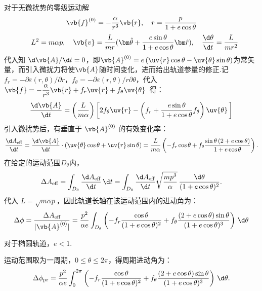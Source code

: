 对于无微扰势的零级运动解
\begin{equation*}
	\vb{f}^{(0)} = -\dfrac{\alpha}{r^3} \vb{r},\quad r=\frac{p}{1+e\cos\theta}
\end{equation*}
\begin{equation*}
	\quad L^2=m\alpha p,\quad \vb{v}=\frac{L}{mr}(\bm\hat{\theta}+\frac{e\sin\theta}{1+e\cos\theta}\bm\hat{r}),\quad \frac{\d \theta}{\d t}=\frac{L}{mr^2}
\end{equation*}
代入知 \(\d \vb{A}/\d t=0\)，即\(\vb{A}^{(0)} = e\, (\uv{r} \cos\theta - \uv{\theta} \sin\theta)\)为常矢量，而引入微扰力将使\(\vb{A}\)随时间变化，进而给出轨道参量的修正.记 \(f_r = -\partial\varepsilon(r,\theta)/\partial r\)，\(f_{\theta} = -\partial\varepsilon(r,\theta)/r\partial\theta\)，代入 \(\vb{f} = -\dfrac{\alpha}{r^3} \vb{r} + f_r \uv{r} + f_{\theta} \uv{\theta}\,\) 得：
\begin{equation*}
	\dfrac{\d \vb{A}}{\d t} = \left( \dfrac{L}{m \alpha} \right) \left[ 2 f_{\theta} \uv{r} - \left( f_r + \dfrac{e \sin\theta}{1 + e \cos\theta} f_{\theta} \right) \uv{\theta} \,\right]
\end{equation*}
引入微扰势后，有垂直于 \(\vb{A}^{(0)}\) 的有效变化率：
\begin{equation*}
	\dfrac{\d A_{\text{eff}}}{\d t} = \dfrac{\d \vb{A}}{\d t} \cdot (\uv{\theta} \cos\theta + \uv{r} \sin\theta) = \dfrac{L}{m \alpha} \left( -f_r \cos\theta + f_{\theta} \dfrac{\sin\theta\, (2 + e \cos\theta)}{1 + e \cos\theta} \right).
\end{equation*}
在给定的运动范围\(D_{\theta}\)内，
\begin{equation*}
	\Delta A_{\text{eff}} = \int_{D_{\theta}} \dfrac{\d A_{\text{eff}}}{\d t} \, \d t = \int_{D_{\theta}} \dfrac{\d A_{\text{eff}}}{\d t} \sqrt{\dfrac{m p^3}{\alpha}} \, \dfrac{\d \theta}{(1 + e \cos\theta)^2}.
\end{equation*}
代入 \(L = \sqrt{m\alpha p}\)，因此轨道长轴在该运动范围内的进动角为：
\begin{equation*}
	\Delta \phi = \dfrac{\Delta A_{\text{eff}}}{|\vb{A}^{(0)}|} = \dfrac{p^2}{\alpha e} \int_{D_{\theta}} \left( -f_r \dfrac{\cos\theta}{(1 + e \cos\theta)^2} + f_{\theta} \dfrac{(2 + e \cos\theta) \sin\theta}{(1 + e \cos\theta)^3} \right) \, \d \theta
\end{equation*}

对于椭圆轨道，\(e < 1\).

运动范围取为一周期，\(0 \leq \theta \leq 2\pi\)，得周期进动角为：
\begin{equation*}
	\Delta \phi_{\text{pr}} = \dfrac{p^2}{\alpha e} \int_{0}^{2\pi} \left( -f_r \dfrac{\cos\theta}{(1 + e \cos\theta)^2} + f_{\theta} \dfrac{(2 + e \cos\theta) \sin\theta}{(1 + e \cos\theta)^3} \right) \, \d \theta.
\end{equation*}

